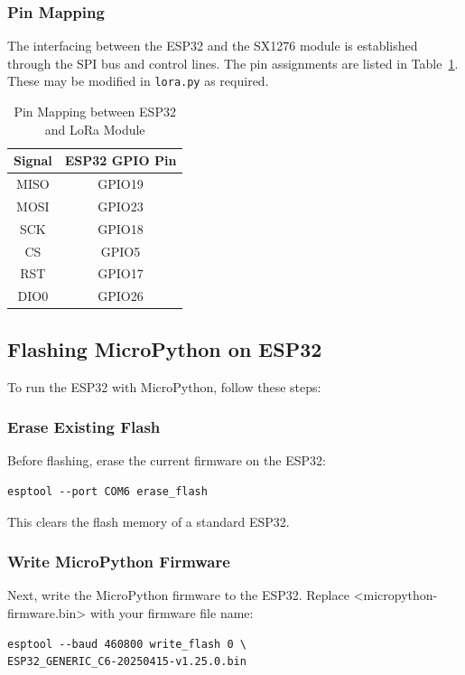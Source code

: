\subsubsection{Pin Mapping}
The interfacing between the ESP32 and the SX1276 module is established through the SPI bus and control lines.  
The pin assignments are listed in Table~\ref{tab:pinmapping}. These may be modified in \texttt{lora.py} as required.

\begin{table}[htbp]
\centering
\label{tab:pinmapping}
\begin{tabular}{|c|c|}
\hline
\textbf{Signal} & \textbf{ESP32 GPIO Pin} \\ \hline
MISO & GPIO19 \\ \hline
MOSI & GPIO23 \\ \hline
SCK  & GPIO18 \\ \hline
CS   & GPIO5  \\ \hline
RST  & GPIO17 \\ \hline
DIO0 & GPIO26 \\ \hline
\end{tabular}
\caption{Pin Mapping between ESP32 and LoRa Module}
\end{table}

\subsection{Flashing MicroPython on ESP32}

To run the ESP32 with MicroPython, follow these steps:

\subsubsection{Erase Existing Flash}
Before flashing, erase the current firmware on the ESP32:

\begin{verbatim}
esptool --port COM6 erase_flash
\end{verbatim}

\noindent This clears the flash memory of a standard ESP32.

\subsubsection{Write MicroPython Firmware}
Next, write the MicroPython firmware to the ESP32. Replace {<micropython-firmware.bin>} with your firmware file name:

\begin{verbatim}
esptool --baud 460800 write_flash 0 \
ESP32_GENERIC_C6-20250415-v1.25.0.bin
\end{verbatim}


